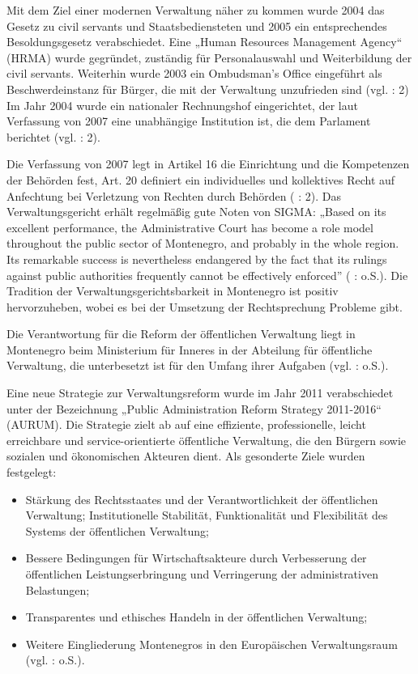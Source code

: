 Mit dem Ziel einer modernen Verwaltung näher zu kommen wurde 2004 das Gesetz zu civil servants und Staatsbediensteten und 2005 ein entsprechendes Besoldungsgesetz verabschiedet. Eine „Human Resources Management Agency“ (HRMA) wurde gegründet, zuständig für Personalauswahl und Weiterbildung der civil servants. Weiterhin wurde 2003 ein Ombudsman’s Office eingeführt als Beschwerdeinstanz für Bürger, die mit der Verwaltung unzufrieden sind (vgl. \cite{freund07} : 2) Im Jahr 2004 wurde ein nationaler Rechnungshof eingerichtet, der laut Verfassung von 2007 eine unabhängige Institution ist, die dem Parlament berichtet (vgl. \cite{oecd08b} : 2).\par
Die Verfassung von 2007 legt in Artikel 16 die Einrichtung und die Kompetenzen der Behörden fest, Art. 20 definiert ein individuelles und kollektives Recht auf Anfechtung bei Verletzung von Rechten durch Behörden (\cite{oecd08b} : 2). Das Verwaltungsgericht erhält regelmäßig gute Noten von SIGMA: „Based on its excellent performance, the Administrative Court has become a role model throughout the public sector of Montenegro, and probably in the whole region. Its remarkable success is nevertheless endangered by the fact that its rulings against public authorities frequently cannot be effectively enforced” (\cite{oecd11a} : o.S.). Die Tradition der Verwaltungsgerichtsbarkeit in Montenegro ist positiv hervorzuheben, wobei es bei der Umsetzung der Rechtsprechung Probleme gibt. \par
Die Verantwortung für die Reform der öffentlichen Verwaltung liegt in Montenegro beim Ministerium für Inneres in der Abteilung für öffentliche Verwaltung, die unterbesetzt ist für den Umfang ihrer Aufgaben (vgl. \cite{oecd11a} : o.S.).\par
Eine neue Strategie zur Verwaltungsreform wurde im Jahr 2011 verabschiedet unter der Bezeichnung „Public Administration Reform Strategy 2011-2016“ (AURUM). Die Strategie zielt ab auf eine effiziente, professionelle, leicht erreichbare und service-orientierte öffentliche Verwaltung, die den Bürgern sowie sozialen und ökonomischen Akteuren dient. Als gesonderte Ziele wurden festgelegt:
\begin{itemize} \itemsep1pt \parskip0pt 
\item Stärkung des Rechtsstaates und der Verantwortlichkeit der öffentlichen Verwaltung;
Institutionelle Stabilität, Funktionalität und Flexibilität des Systems der öffentlichen Verwaltung; 
\item Bessere Bedingungen für Wirtschaftsakteure durch Verbesserung der öffentlichen Leistungserbringung und Verringerung der administrativen Belastungen; 
\item Transparentes und ethisches Handeln in der öffentlichen Verwaltung; 
\item Weitere Eingliederung Montenegros in den Europäischen Verwaltungsraum (vgl. \cite{govmont11} : o.S.).
\end{itemize}

